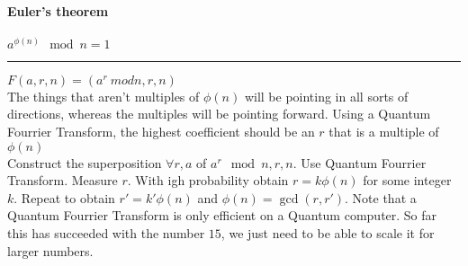 \documentclass[12 pt]{article}
\begin{document}
\paragraph{Euler's theorem}
$a^{\phi(n)}\mod n = 1$
\\ \noindent \rule{\textwidth}{0.5pt}
$F(a,r,n) = (a^r\ mod n,r,n)$
\\ The things that aren't multiples of $\phi(n)$ will be pointing in
all sorts of directions, whereas the multiples will be pointing
forward. Using a Quantum Fourrier Transform, the highest coefficient
should be an $r$ that is a multiple of $\phi(n)$
\\ Construct the superposition $\forall r, a$ of $a^r\mod n, r,n$. Use
Quantum Fourrier Transform. Measure $r$. With igh probability obtain
$r = k \phi(n)$ for some integer $k$. Repeat to obtain $r'=k' \phi(n)$
and $\phi(n) = \gcd(r,r')$. Note that a Quantum Fourrier Transform is
only efficient on a Quantum computer. So far this has succeeded with
the number $15$, we just need to be able to scale it for larger numbers.
\end{document}
